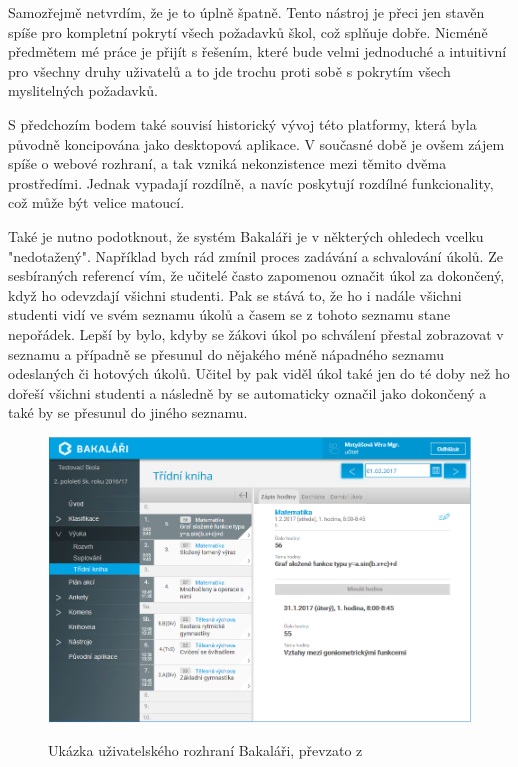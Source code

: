 Samozřejmě netvrdím, že je to úplně špatně. Tento nástroj je přeci jen stavěn spíše pro kompletní pokrytí všech požadavků škol, což splňuje dobře. Nicméně předmětem mé práce je přijít s řešením, které bude velmi jednoduché a intuitivní pro všechny druhy uživatelů a to jde trochu proti sobě s pokrytím všech myslitelných požadavků.

S předchozím bodem také souvisí historický vývoj této platformy, která byla původně koncipována jako desktopová aplikace. V současné době je ovšem zájem spíše o webové rozhraní, a tak vzniká nekonzistence mezi těmito dvěma prostředími. Jednak vypadají rozdílně, a navíc poskytují rozdílné funkcionality, což může být velice matoucí.

Také je nutno podotknout, že systém Bakaláři je v některých ohledech vcelku "nedotažený". Například bych rád zmínil proces zadávání a schvalování úkolů. Ze sesbíraných referencí vím, že učitelé často zapomenou označit úkol za dokončený, když ho odevzdají všichni studenti. Pak se stává to, že ho i nadále všichni studenti vidí ve svém seznamu úkolů a časem se z tohoto seznamu stane nepořádek. Lepší by bylo, kdyby se žákovi úkol po schválení přestal zobrazovat v seznamu a případně se přesunul do nějakého méně nápadného seznamu odeslaných či hotových úkolů. Učitel by pak viděl úkol také jen do té doby než ho dořeší všichni studenti a následně by se automaticky označil jako dokončený a také by se přesunul do jiného seznamu.

\begin{figure}[H]
    \caption{Ukázka uživatelského rozhraní Bakaláři, převzato z \cite{bakalari}}
    \centering
    \includegraphics[width=\textwidth]{images/bakalari}
    \label{img:bakalari}
\end{figure}

